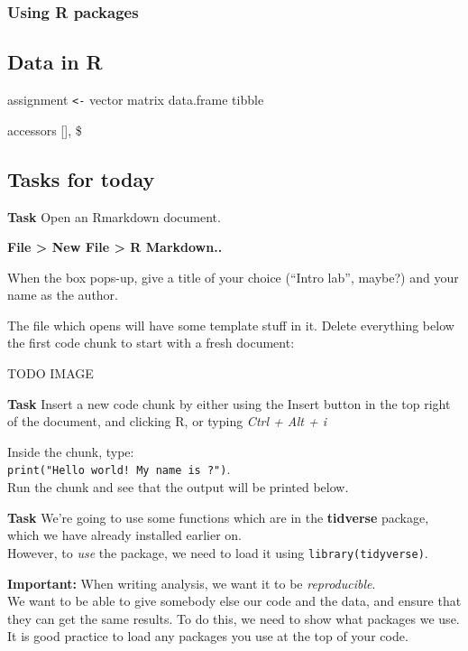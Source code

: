 \documentclass[12pt,]{krantz}
\begin{document}
\hypertarget{using-r-packages}{%
\subsubsection*{Using R packages}\label{using-r-packages}}

\hypertarget{data-in-r}{%
\subsection*{Data in R}\label{data-in-r}}

assignment \texttt{\textless{}-}
vector
matrix
data.frame
tibble

accessors {[}{]}, \$

\hypertarget{tasks-for-today}{%
\subsection*{Tasks for today}\label{tasks-for-today}}

\textbf{Task}
Open an Rmarkdown document.

\textbf{File \textgreater{} New File \textgreater{} R Markdown..}

When the box pops-up, give a title of your choice (``Intro lab'', maybe?) and your name as the author.

The file which opens will have some template stuff in it. Delete everything below the first code chunk to start with a fresh document:

TODO IMAGE

\textbf{Task}
Insert a new code chunk by either using the Insert button in the top right of the document, and clicking R, or typing \emph{Ctrl + Alt + i}

Inside the chunk, type:\\
\texttt{print("Hello\ world!\ My\ name\ is\ ?")}.\\
Run the chunk and see that the output will be printed below.

\textbf{Task}
We're going to use some functions which are in the \textbf{tidverse} package, which we have already installed earlier on.\\
However, to \emph{use} the package, we need to load it using \texttt{library(tidyverse)}.

\textbf{Important:} When writing analysis, we want it to be \emph{reproducible}.\\
We want to be able to give somebody else our code and the data, and ensure that they can get the same results.
To do this, we need to show what packages we use.\\
It is good practice to load any packages you use at the top of your code.
\end{document}

